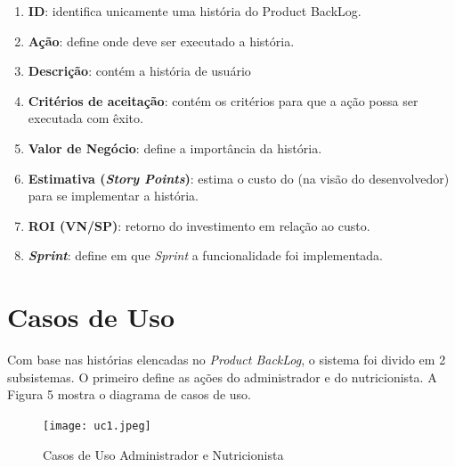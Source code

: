 \documentclass[
	12pt,				%
    oneside,			%
	a4paper,			%
	english,			%
	french,				%
	spanish,			%
	brazil,				%
	]{abntex2}
\begin{document}
\begin{enumerate}

\item \textbf{ID}: identifica unicamente uma história do Product BackLog.
\item \textbf{Ação}: define onde deve ser executado a história.
\item \textbf{Descrição}: contém a história de usuário
\item \textbf{Critérios de aceitação}: contém os critérios para que a ação possa ser
executada com êxito.
\item \textbf{Valor de Negócio}: define a importância da história.
\item \textbf{Estimativa (\textit{Story Points})}: estima o custo do (na visão do desenvolvedor)
para se implementar a história.
\item \textbf{ROI (VN/SP)}: retorno do investimento em relação ao custo.
\item \textbf{\textit{Sprint}}: define em que \textit{Sprint} a funcionalidade foi implementada.

\end{enumerate}

\section{Casos de Uso}

Com base nas histórias elencadas no \textit{Product BackLog}, o sistema foi divido em 2
subsistemas. O primeiro define as ações do administrador e do nutricionista. A Figura 5
mostra o diagrama de casos de uso.

\begin{figure} [hbt] 
\label{table1} 
\caption{Casos de Uso Administrador e Nutricionista}
\begin{center}
\texttt{[image: uc1.jpeg]}
\end{center}
\end{figure}
\end{document}
